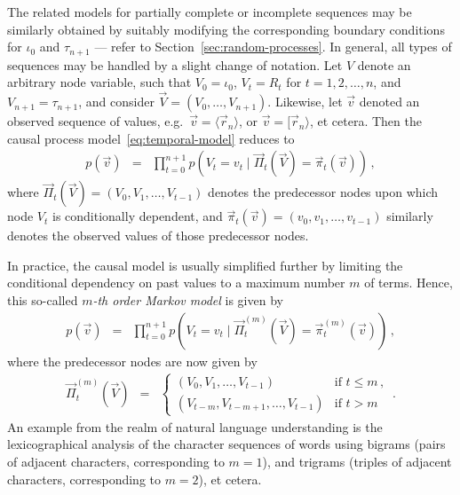 \documentclass[a4paper]{article}
\begin{document}
The related models for partially complete or incomplete sequences may be similarly obtained
by suitably modifying the corresponding boundary conditions for $\iota_0$ and $\tau_{n+1}$
--- refer to Section~\ref{sec:random-processes}.
In general, all types of sequences may be handled by a slight change of notation.
Let $V$ denote an arbitrary node variable, such that $V_0=\iota_0$, $V_t=R_t$ for $t=1,2,\ldots,n$,
and $V_{n+1}=\tau_{n+1}$, and consider $\vec{V}=(V_0,\ldots,V_{n+1})$. 
Likewise, let $\vec{v}$ denoted an observed sequence of values, e.g.\ $\vec{v}=\langle\vec{r}_n\rangle$, or
$\vec{v}=[\vec{r}_n\rangle$, et cetera. Then the causal process model~\eqref{eq:temporal-model} reduces to
\begin{eqnarray}
p(\vec{v}) & = & \prod_{t=0}^{n+1}p(V_t=v_t\;|\;\vec{\Pi}_t(\vec{V})=\vec{\pi}_t(\vec{v}))\,,
\end{eqnarray}
where $\vec{\Pi}_t(\vec{V})=(V_0,V_1,\ldots,V_{t-1})$ denotes the predecessor nodes upon which node $V_t$
is conditionally dependent, and 
$\vec{\pi}_t(\vec{v})=(v_0,v_1,\ldots,v_{t-1})$ similarly denotes the observed values of those predecessor nodes. 

In practice, the causal model is usually simplified further by limiting the 
conditional dependency on past values to a maximum number $m$ of terms.
Hence, this so-called {\em $m$-th order Markov model} is given by
\begin{eqnarray}
p(\vec{v}) & = & \prod_{t=0}^{n+1}p(V_t=v_t\;|\;\vec{\Pi}^{(m)}_t(\vec{V})=\vec{\pi}_t^{(m)}(\vec{v}))\,,
\end{eqnarray}
where the predecessor nodes are now given by
\begin{eqnarray}
\vec{\Pi}_t^{(m)}(\vec{V}) & = & 
\left\{
\begin{array}{ll}
(V_0,V_1,\ldots,V_{t-1}) & \mbox{if }t\le m\,,
\\
(V_{t-m},V_{t-m+1},\ldots,V_{t-1}) & \mbox{if }t>m
\end{array}
\right.\,.
\end{eqnarray}
An example from the realm of natural language understanding is the lexicographical analysis of the character
sequences of words using bigrams (pairs of adjacent characters, corresponding to $m=1$), and trigrams 
(triples of adjacent characters, corresponding to $m=2$), et cetera.
\end{document}
